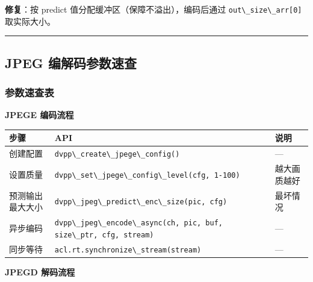 \textbf{修复}：按 predict 值分配缓冲区（保障不溢出），编码后通过
\passthrough{\lstinline!out\_size\_arr[0]!} 取实际大小。

\begin{center}\rule{0.5\linewidth}{0.5pt}\end{center}

\subsection{JPEG 编解码参数速查}\label{src-book-chapter6-h143}

\subsubsection{参数速查表}\label{src-book-chapter6-h144}

\textbf{JPEGE 编码流程}

\begin{longtable}[]{@{}
  >{\raggedright\arraybackslash}p{}
  >{\raggedright\arraybackslash}p{}
  >{\raggedright\arraybackslash}p{}@{}}
\toprule\noalign{}
\begin{minipage}[b]{\linewidth}\raggedright
步骤
\end{minipage} & \begin{minipage}[b]{\linewidth}\raggedright
API
\end{minipage} & \begin{minipage}[b]{\linewidth}\raggedright
说明
\end{minipage} \\
\midrule\noalign{}
\endhead
\bottomrule\noalign{}
\endlastfoot
创建配置 & \passthrough{\lstinline!dvpp\_create\_jpege\_config()!} &
--- \\
设置质量 &
\passthrough{\lstinline!dvpp\_set\_jpege\_config\_level(cfg, 1-100)!} &
越大画质越好 \\
预测输出最大大小 &
\passthrough{\lstinline!dvpp\_jpeg\_predict\_enc\_size(pic, cfg)!} &
最坏情况 \\
异步编码 &
\passthrough{\lstinline!dvpp\_jpeg\_encode\_async(ch, pic, buf, size\_ptr, cfg, stream)!}
& --- \\
同步等待 & \passthrough{\lstinline!acl.rt.synchronize\_stream(stream)!}
& --- \\
\end{longtable}

\textbf{JPEGD 解码流程}


